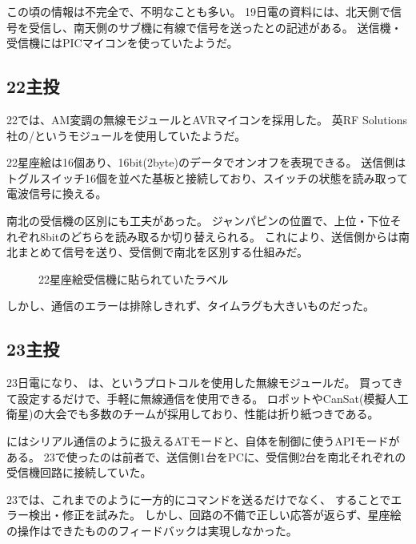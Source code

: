 \documentclass[letterpaper,10pt,dvipdfmx]{sphinxmanual}
\begin{document}
この頃の情報は不完全で、不明なことも多い。
19日電の資料には、北天側で信号を受信し、南天側のサブ機に有線で信号を送ったとの記述がある。
送信機・受信機にはPICマイコンを使っていたようだ。


\subsection{22主投}
\label{\detokenize{wireless/wireless:id5}}
22では、AM変調の無線モジュールとAVRマイコンを採用した。 英RF
Solutions社の/というモジュールを使用していたようだ。

22星座絵は16個あり、16bit(2byte)のデータでオンオフを表現できる。
送信側はトグルスイッチ16個を並べた基板と接続しており、スイッチの状態を読み取って電波信号に換える。

南北の受信機の区別にも工夫があった。
ジャンパピンの位置で、上位・下位それぞれ8bitのどちらを読み取るか切り替えられる。
これにより、送信側からは南北まとめて信号を送り、受信側で南北を区別する仕組みだ。
\begin{figure}[htbp]
\centering
\capstart

\noindent{}
\caption{22星座絵受信機に貼られていたラベル}\label{\detokenize{wireless/wireless:id17}}\end{figure}

しかし、通信のエラーは排除しきれず、タイムラグも大きいものだった。


\subsection{23主投}
\label{\detokenize{wireless/wireless:id6}}
23日電になり、
は、というプロトコルを使用した無線モジュールだ。
買ってきて設定するだけで、手軽に無線通信を使用できる。
ロボットやCanSat(模擬人工衛星)の大会でも多数のチームが採用しており、性能は折り紙つきである。

にはシリアル通信のように扱えるATモードと、自体を制御に使うAPIモードがある。
23で使ったのは前者で、送信側1台をPCに、受信側2台を南北それぞれの受信機回路に接続していた。

23では、これまでのように一方的にコマンドを送るだけでなく、
することでエラー検出・修正を試みた。
しかし、回路の不備で正しい応答が返らず、星座絵の操作はできたもののフィードバックは実現しなかった。
\end{document}
